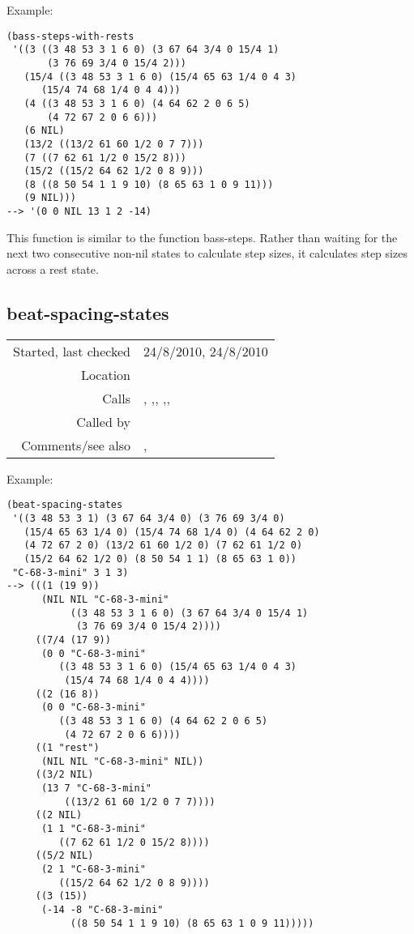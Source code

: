 \vspace{0.5cm}
\noindent Example:
\begin{verbatim}
(bass-steps-with-rests
 '((3 ((3 48 53 3 1 6 0) (3 67 64 3/4 0 15/4 1)
       (3 76 69 3/4 0 15/4 2)))
   (15/4 ((3 48 53 3 1 6 0) (15/4 65 63 1/4 0 4 3)
	  (15/4 74 68 1/4 0 4 4)))
   (4 ((3 48 53 3 1 6 0) (4 64 62 2 0 6 5)
       (4 72 67 2 0 6 6)))
   (6 NIL)
   (13/2 ((13/2 61 60 1/2 0 7 7)))
   (7 ((7 62 61 1/2 0 15/2 8)))
   (15/2 ((15/2 64 62 1/2 0 8 9)))
   (8 ((8 50 54 1 1 9 10) (8 65 63 1 0 9 11)))
   (9 NIL)))
--> '(0 0 NIL 13 1 2 -14)
\end{verbatim}

\noindent This function is similar to the function
bass-steps. Rather than waiting for the next two
consecutive non-nil states to calculate step sizes, it
calculates step sizes across a rest state.


\subsection*{beat-spacing-states}\label{fun:beat-spacing-states}

\vspace{0.3cm}
\begin{tabular}{r|p{8cm}}
Started, last checked & 24/8/2010, 24/8/2010 \\
Location & \nameref{sec:spacing-states} \\
Calls & \nameref{fun:append-offtimes}, \nameref{fun:bass-steps-with-rests},\newline \nameref{fun:enumerate-append}, \nameref{fun:nth-list-of-lists},\newline \nameref{fun:segments-strict}, \nameref{fun:spacing} \\
Called by & \\
Comments/see also & \nameref{fun:beat-spacing-states<-},\newline \nameref{fun:spacing-holding-states}
\end{tabular}

\vspace{0.5cm}
\noindent Example:
\begin{verbatim}
(beat-spacing-states
 '((3 48 53 3 1) (3 67 64 3/4 0) (3 76 69 3/4 0)
   (15/4 65 63 1/4 0) (15/4 74 68 1/4 0) (4 64 62 2 0)
   (4 72 67 2 0) (13/2 61 60 1/2 0) (7 62 61 1/2 0)
   (15/2 64 62 1/2 0) (8 50 54 1 1) (8 65 63 1 0))
 "C-68-3-mini" 3 1 3)
--> (((1 (19 9))
      (NIL NIL "C-68-3-mini"
           ((3 48 53 3 1 6 0) (3 67 64 3/4 0 15/4 1)
            (3 76 69 3/4 0 15/4 2))))
     ((7/4 (17 9))
      (0 0 "C-68-3-mini"
         ((3 48 53 3 1 6 0) (15/4 65 63 1/4 0 4 3)
          (15/4 74 68 1/4 0 4 4))))
     ((2 (16 8))
      (0 0 "C-68-3-mini"
         ((3 48 53 3 1 6 0) (4 64 62 2 0 6 5)
          (4 72 67 2 0 6 6))))
     ((1 "rest")
      (NIL NIL "C-68-3-mini" NIL))
     ((3/2 NIL)
      (13 7 "C-68-3-mini"
          ((13/2 61 60 1/2 0 7 7))))
     ((2 NIL)
      (1 1 "C-68-3-mini"
         ((7 62 61 1/2 0 15/2 8))))
     ((5/2 NIL)
      (2 1 "C-68-3-mini"
         ((15/2 64 62 1/2 0 8 9))))
     ((3 (15))
      (-14 -8 "C-68-3-mini"
           ((8 50 54 1 1 9 10) (8 65 63 1 0 9 11)))))
\end{verbatim}

